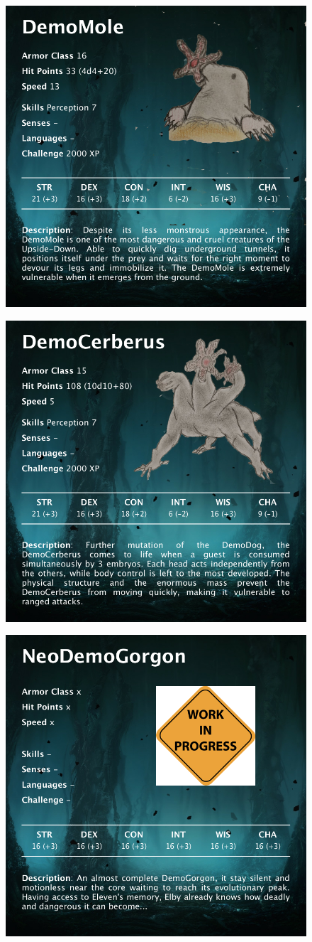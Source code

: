 \begin{figure}[H]
	\centering
	\includegraphics[width=0.7\linewidth]{images/visual_stats/demomole.png}
\end{figure}


\begin{figure}[H]
	\centering
	\includegraphics[width=0.7\linewidth]{images/visual_stats/democerberus.png}
\end{figure}

\begin{figure}[H]
	\centering
	\includegraphics[width=0.7\linewidth]{images/visual_stats/neodemogorgon.png}
\end{figure}
\newpage


